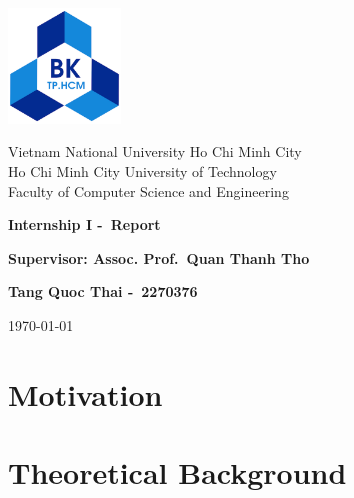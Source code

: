 \documentclass{article}
\author{}
\newcommand{\schoolname}{Vietnam National University Ho Chi Minh City \\ Ho Chi Minh City University of Technology \\ Faculty of Computer Science and Engineering}
\newcommand{\schoollogo}{\includegraphics[width=3cm]{img/hcmut.png}}
\begin{document}
\begin{titlepage}
    \centering
    \vspace*{2cm}
    \schoollogo\par
    \vspace{1cm}
    {\Large \schoolname\par}
    \vspace{3cm}
    {\huge\bfseries Internship I -\ Report \par}
    \vspace{1cm}
    {\Large\bfseries Supervisor: Assoc. Prof.\ Quan Thanh Tho \par}
    \vspace{1cm}
    {\large \bfseries Tang Quoc Thai -\ 2270376\par}
    \vfill
    {\large \today\par}
\end{titlepage}

\section{Motivation}
\section{Theoretical Background}
\end{document}
